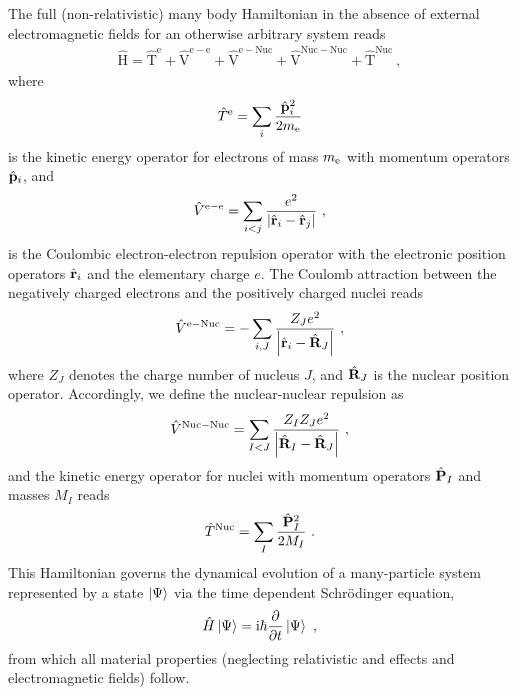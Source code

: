 The full (non-relativistic) many body Hamiltonian in the absence of external electromagnetic fields for an otherwise arbitrary system reads
\begin{align}
    \hat{\mathrm{H}}
        = \hat{\mathrm{T}}^{\mathrm{e}}
        + \hat{\mathrm{V}}^{\mathrm{e}-\mathrm{e}}
        + \hat{\mathrm{V}}^{\mathrm{e}-\mathrm{Nuc}}
        + \hat{\mathrm{V}}^{\mathrm{Nuc}-\mathrm{Nuc}}
        + \hat{\mathrm{T}}^{\mathrm{Nuc}}~,
    \label{eq:Hamiltonian}
\end{align}
where
\begin{align}
    \hat T^{\rm e} 
        =\sum_{i} \frac{\hat{\mathbf{p}}_{i}^{2}}{2 m_{\rm e}}
    \label{eq:Te}
\end{align}
is the kinetic energy operator for electrons of mass $m_{\rm e}$ with momentum operators $\hat{\bf p}_i$, and 
\begin{align}
    \hat V^{\rm e-e}
        = \sum_{i < j} \frac{e^{2}}{\left|\hat{\b r}_{i}-\hat{\bf r}_{j}\right|}~,
    \label{eq:Ve}
\end{align}
is the Coulombic electron-electron repulsion operator with the electronic position operators $\hat{\bf r}_i$ and the elementary charge $e$. 
The Coulomb attraction between the negatively charged electrons and the positively charged nuclei reads
\begin{align}
    \hat V^{\rm e-Nuc}
        = -\sum_{i, J} \frac{Z_J e^{2}}{\left|\hat{\b r}_{i}-\hat{\bf R}_{J}\right|}~,
    \label{eq:Venuc}
\end{align}
where $Z_J$ denotes the charge number of nucleus $J$, and $\hat{\bf R}_J$ is the nuclear position operator. 
Accordingly, we define the nuclear-nuclear repulsion as
\begin{align}
    \hat V^{\rm Nuc-Nuc}
        = \sum_{I < J} \frac{Z_{I} Z_{J} e^{2}}{\left|\hat{\b R}_{I}-\hat{\bf R}_{J}\right|}~,
    \label{eq:Vnuc}
\end{align}
and the kinetic energy operator for nuclei with momentum operators $\hat{\bf P}_I$ and masses $M_I$ reads
\begin{align}
    \hat T^{\rm Nuc} 
        =\sum_{I} \frac{\hat{\mathbf{P}}_{I}^{2}}{2 M_{I}}~.
    \label{eq:Tnuc}
\end{align}
This Hamiltonian governs the dynamical evolution of a many-particle system represented by a state $\ket{\Psi}$ via the time dependent Schr\"odinger equation,
\begin{align}
	\hat H \ket{\Psi} = \im \hbar \frac{\partial}{\partial t} \ket{\Psi}~,
	\label{eq:TdSE}
\end{align}
from which all material properties (neglecting relativistic and effects and electromagnetic fields) follow.

